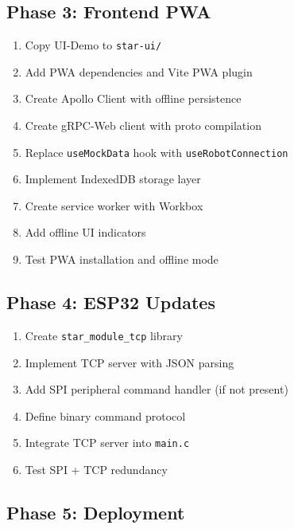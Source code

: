 \subsection{Phase 3: Frontend PWA}

\begin{enumerate}
    \item[$\square$] Copy UI-Demo to \texttt{star-ui/}
    \item[$\square$] Add PWA dependencies and Vite PWA plugin
    \item[$\square$] Create Apollo Client with offline persistence
    \item[$\square$] Create gRPC-Web client with proto compilation
    \item[$\square$] Replace \texttt{useMockData} hook with \texttt{useRobotConnection}
    \item[$\square$] Implement IndexedDB storage layer
    \item[$\square$] Create service worker with Workbox
    \item[$\square$] Add offline UI indicators
    \item[$\square$] Test PWA installation and offline mode
\end{enumerate}

\subsection{Phase 4: ESP32 Updates}

\begin{enumerate}
    \item[$\square$] Create \texttt{star\_module\_tcp} library
    \item[$\square$] Implement TCP server with JSON parsing
    \item[$\square$] Add SPI peripheral command handler (if not present)
    \item[$\square$] Define binary command protocol
    \item[$\square$] Integrate TCP server into \texttt{main.c}
    \item[$\square$] Test SPI + TCP redundancy
\end{enumerate}

\subsection{Phase 5: Deployment}

